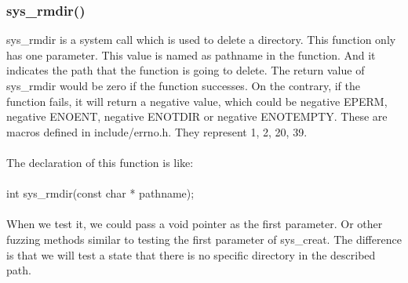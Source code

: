 \documentclass[twoside]{article}
\begin{document}
\begin{multicols}{2}
\subsubsection{sys\_rmdir()}
sys\_rmdir is a system call which is used to delete a directory. This function only has one parameter. This value is named as pathname in the function. And it indicates the path that the function is going to delete. The return value of sys\_rmdir would be zero if the function successes. On the contrary, if the function fails, it will return a negative value, which could be negative EPERM, negative ENOENT, negative ENOTDIR or negative ENOTEMPTY. These are macros defined in include/errno.h. They represent 1, 2, 20, 39.\\\\
The declaration of this function is like:\\\\
int sys\_rmdir(const char * pathname);\\\\
When we test it, we could pass a void pointer as the first parameter. Or other fuzzing methods similar to testing the first parameter of sys\_creat. The difference is that we will test a state that there is no specific directory in the described path.

\end{multicols}
\end{document}
